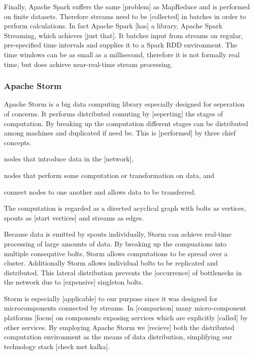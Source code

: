 Finally, Apache Spark suffers the same [problem] as MapReduce and is performed on finite datasets. Therefore streams need to be [collected] in batches in order to perform calculations. In fact Apache Spark [has] a library, Apache Spark Streaming\cite{web:spark_streaming}, which achieves [just that]. It batches input from streams on regular, pre-specified time intervals and supplies it to a Spark RDD environment. The time windows can be as small as a millisecond, therefore it is not formally real time, but does achieve near-real-time stream processing.


\subsubsection{Apache Storm}
Apache Storm is a big data computing library especially designed for seperation of concerns. It performs distributed comuting by [seperting] the stages of computation. By breaking up the computation different stages can be distributed among machines and duplicated if need be. This is [performed] by three chief concepts. 
\begin{description}
\nospace
\item[Spouts:] nodes that introduce data in the [network],
\item[Bolts:] nodes that perform some computation or transformation on data, and
\item[Streams:] connect nodes to one another and allows data to be transferred.
\end{description}
The computation is regarded as a directed acyclical graph with bolts as vertices, spouts as [start vertices] and streams as edges.

Because data is emitted by spouts individually, Storm can achieve real-time processing of large amounts of data. By breaking up the compuations into multiple consequtive bolts, Storm allows computations to be spread over a cluster. Additionally Storm allows individual bolts to be replicated and distributed. This lateral distribution prevents the [occurrence] of bottlenecks in the network due to [expensive] singleton bolts.

Storm is especially [applicable] to our purpose since it was designed for microcomponents connected by streams. In [comparison] many micro-component platforms [focus] on components exposing services which are explicitly [called] by other services\cite{refs: spring, etc}. By employing Apache Storm we [recieve] both the distributed computation environment as the means of data distribution, simplifying our technology stack [check met kafka].

